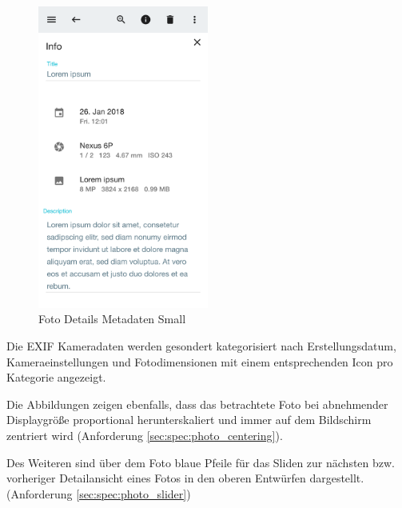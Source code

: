 \begin{figure}[htp]     %
\centering
\includegraphics[width=0.5\textwidth]{images/form_small} 
\caption{Foto Details Metadaten Small}\label{fig:form_small}
\end{figure}

Die EXIF Kameradaten werden gesondert kategorisiert nach Erstellungsdatum, Kameraeinstellungen und Fotodimensionen mit einem entsprechenden Icon pro Kategorie angezeigt.

Die Abbildungen zeigen ebenfalls, dass das betrachtete Foto bei abnehmender Displaygröße proportional herunterskaliert und immer auf dem Bildschirm zentriert wird (Anforderung \ref{sec:spec:photo_centering}).

Des Weiteren sind über dem Foto blaue Pfeile für das Sliden zur nächsten bzw. vorheriger Detailansicht eines Fotos in den oberen Entwürfen dargestellt. (Anforderung \ref{sec:spec:photo_slider})
